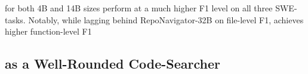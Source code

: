 \methodname for both 4B and 14B sizes perform at a much higher F1 level on all three SWE-tasks. Notably, while lagging behind RepoNavigator-32B on file-level F1, \methodname achieves higher function-level F1








\subsection{\methodname as a Well-Rounded Code-Searcher}

